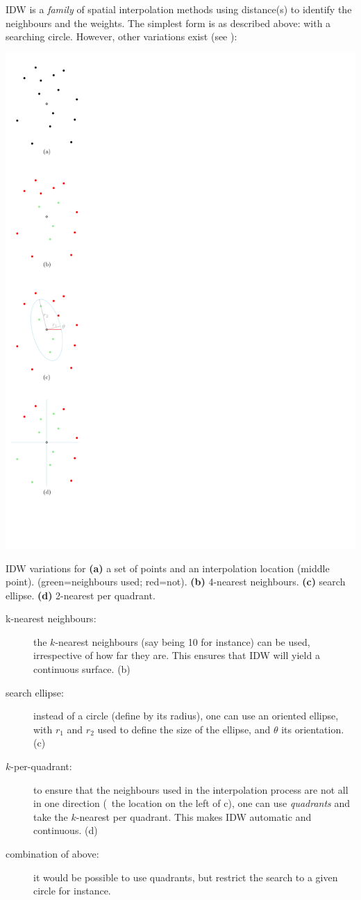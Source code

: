 IDW is a \emph{family} of spatial interpolation methods using distance(s) to identify the neighbours and the weights.
The simplest form is as described above: with a searching circle.
However, other variations exist (see ):
\begin{marginfigure}
  \centering
  \includegraphics[width=0.6\linewidth,page=1]{figs/idwvar}%
  \caption{IDW variations for \textbf{(a)} a set of points and an interpolation location (middle point). (green=neighbours used; red=not). \textbf{(b)} 4-nearest neighbours. \textbf{(c)} search ellipse. \textbf{(d)} 2-nearest per quadrant.}%
\end{marginfigure}

\begin{description}
  \item[k-nearest neighbours:] the $k$-nearest neighbours (say being 10 for instance) can be used, irrespective of how far they are. This ensures that IDW will yield a continuous surface. (b)
  \item[search ellipse:] instead of a circle (define by its radius), one can use an oriented ellipse, with $r_1$ and $r_2$ used to define the size of the ellipse, and $\theta$ its orientation. (c)
  \item[$k$-per-quadrant:] to ensure that the neighbours used in the interpolation process are not all in one direction (\eg\ the location on the left of c), one can use \emph{quadrants} and take the $k$-nearest per quadrant. This makes IDW automatic and continuous. (d)
  \item[combination of above:] it would be possible to use quadrants, but restrict the search to a given circle for instance.
\end{description}



